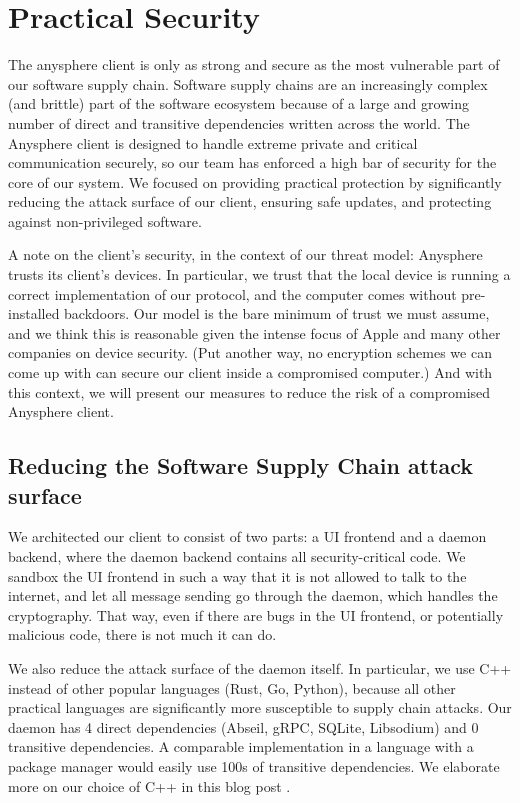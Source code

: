 \section{Practical Security}

The anysphere client is only as strong and secure as the most vulnerable part of our software supply chain. Software supply chains are an increasingly complex (and brittle) part of the software ecosystem because of a large and growing number of direct and transitive dependencies written across the world. 
The Anysphere client is designed to handle extreme private and critical communication securely, so our team has enforced a high bar of security for the core of our system. We focused on providing practical protection by significantly reducing the attack surface of our client, ensuring safe updates, and protecting against non-privileged software. 

A note on the client's security, in the context of our threat model: Anysphere trusts its client's devices. 
In particular, we trust that the local device is running a correct implementation of our protocol, and the computer comes without pre-installed backdoors. 
Our model is the bare minimum of trust we must assume, and we think this is reasonable given the intense focus of Apple and many other companies on device security. 
(Put another way, no encryption schemes we can come up with can secure our client inside a compromised computer.)
And with this context, we will present our measures to reduce the risk of a compromised Anysphere client.

\subsection{Reducing the Software Supply Chain attack surface}
We architected our client to consist of two parts: a UI frontend and a daemon backend, where the daemon backend contains all security-critical code. We sandbox the UI frontend in such a way that it is not allowed to talk to the internet, and let all message sending go through the daemon, which handles the cryptography. That way, even if there are bugs in the UI frontend, or potentially malicious code, there is not much it can do.


We also reduce the attack surface of the daemon itself. In particular, we use C++ instead of other popular languages (Rust, Go, Python), because all other practical languages are significantly more susceptible to supply chain attacks. Our daemon has 4 direct dependencies (Abseil, gRPC, SQLite, Libsodium) and 0 transitive dependencies. A comparable implementation in a language with a package manager would easily use 100s of transitive dependencies. We elaborate more on our choice of C++ in this blog post .

